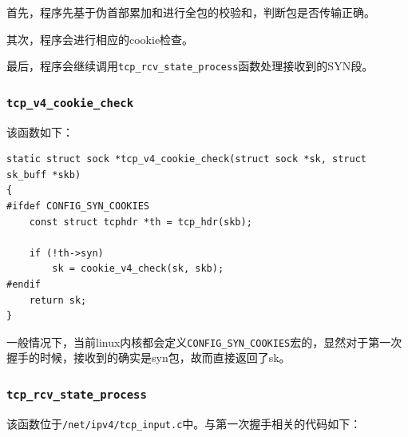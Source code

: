                 首先，程序先基于伪首部累加和进行全包的校验和，判断包是否传输正确。

                其次，程序会进行相应的cookie检查。

                最后，程序会继续调用\texttt{tcp_rcv_state_process}函数处理接收到的SYN段。
            
            \subsubsection{\texttt{tcp_v4_cookie_check}}
                该函数如下：
\begin{verbatim}
static struct sock *tcp_v4_cookie_check(struct sock *sk, struct sk_buff *skb)
{
#ifdef CONFIG_SYN_COOKIES
    const struct tcphdr *th = tcp_hdr(skb);

    if (!th->syn)
        sk = cookie_v4_check(sk, skb);
#endif
    return sk;
}
\end{verbatim}

                一般情况下，当前linux内核都会定义\texttt{CONFIG_SYN_COOKIES}宏的，显然对于第一次握手的时候，接收到的确实是syn包，故而直接返回了sk。
            \subsubsection{\texttt{tcp_rcv_state_process}}
                该函数位于\texttt{/net/ipv4/tcp_input.c}中。与第一次握手相关的代码如下：

